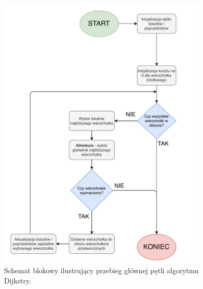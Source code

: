 \documentclass[12pt]{article}
\begin{document}
\begin{figure}[H]
\centering
\includegraphics[width=0.9\textwidth]{static/Diagram3.pdf}
\caption{Schemat blokowy ilustrujący przebieg głównej pętli algorytmu Dijkstry.}
\label{fig:diagram3}
\end{figure}
\end{document}
